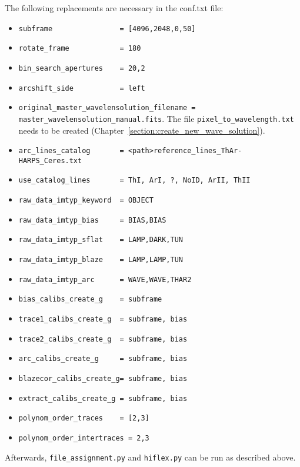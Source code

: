 \documentclass[10pt,a4paper]{article}
\begin{document}
\noindent The following replacements are necessary in the conf.txt file:
\begin{itemize}\setlength\itemsep{0em}
  \small
  \item \verb|subframe                = [4096,2048,0,50]|
  \item \verb|rotate_frame            = 180|
  \item \verb|bin_search_apertures    = 20,2|
  \item \verb|arcshift_side           = left|
  \item \verb|original_master_wavelensolution_filename = master_wavelensolution_manual.fits|. The file \verb|pixel_to_wavelength.txt| needs to be created (Chapter~\ref{section:create_new_wave_solution}).
  \item \verb|arc_lines_catalog 	  = <path>reference_lines_ThAr-HARPS_Ceres.txt|
  \item \verb|use_catalog_lines 	  = ThI, ArI, ?, NoID, ArII, ThII|
  \item \verb|raw_data_imtyp_keyword  = OBJECT|
  \item \verb|raw_data_imtyp_bias     = BIAS,BIAS|
  \item \verb|raw_data_imtyp_sflat    = LAMP,DARK,TUN|
  \item \verb|raw_data_imtyp_blaze    = LAMP,LAMP,TUN|
  \item \verb|raw_data_imtyp_arc      = WAVE,WAVE,THAR2|
  \item \verb|bias_calibs_create_g    = subframe|
  \item \verb|trace1_calibs_create_g  = subframe, bias|
  \item \verb|trace2_calibs_create_g  = subframe, bias|
  \item \verb|arc_calibs_create_g     = subframe, bias|
  \item \verb|blazecor_calibs_create_g= subframe, bias|
  \item \verb|extract_calibs_create_g = subframe, bias|
  \item \verb|polynom_order_traces    = [2,3]|
  \item \verb|polynom_order_intertraces = 2,3|
\end{itemize}

\noindent Afterwards, \verb|file_assignment.py| and \verb|hiflex.py| can be run as described above.
\end{document}
